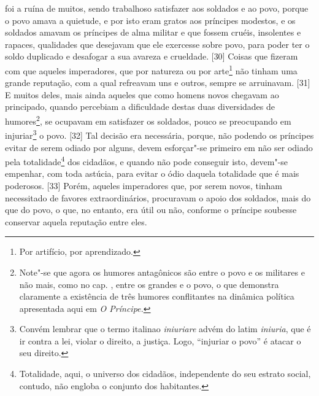 foi a ruína de muitos, sendo trabalhoso satisfazer aos soldados e ao
povo, porque o povo amava a quietude, e por isto eram gratos aos
príncipes modestos, e os soldados amavam os príncipes de alma militar e
que fossem cruéis, insolentes e rapaces, qualidades que desejavam que
ele exercesse sobre povo, para poder ter o soldo duplicado e desafogar a
sua avareza e crueldade. {[}30{]} Coisas que fizeram com que aqueles
imperadores, que por natureza ou por arte\footnote{Por artifício, por
  aprendizado.} não tinham uma grande reputação, com a qual refreavam
uns e outros, sempre se arruinavam. {[}31{]} E muitos deles, mais ainda
aqueles que como homens novos chegavam ao principado, quando percebiam a
dificuldade destas duas diversidades de humores\footnote{Note"-se que
  agora os humores antagônicos são entre o povo e os militares e não
  mais, como no cap. , entre os grandes e o povo, o que demonstra
  claramente a existência de três humores conflitantes na dinâmica
  política apresentada aqui em \emph{O Príncipe.}}, se ocupavam em
satisfazer os soldados, pouco se preocupando em injuriar\footnote{Convém
  lembrar que o termo italinao \emph{iniuriare} advém do latim
  \emph{iniuria}, que é ir contra a lei, violar o direito, a justiça.
  Logo, ``injuriar o povo'' é atacar o seu direito.} o povo. {[}32{]}
Tal decisão era necessária, porque, não podendo os príncipes evitar de
serem odiado por alguns, devem esforçar"-se primeiro em não ser odiado
pela totalidade\footnote{Totalidade, aqui, o universo dos cidadãos,
  independente do seu estrato social, contudo, não engloba o conjunto
  dos habitantes.} dos cidadãos, e quando não pode conseguir isto,
devem"-se empenhar, com toda astúcia, para evitar o ódio daquela
totalidade que é mais poderosos. {[}33{]} Porém, aqueles imperadores
que, por serem novos, tinham necessitado de favores extraordinários,
procuravam o apoio dos soldados, mais do que do povo, o que, no entanto,
era útil ou não, conforme o príncipe soubesse conservar aquela reputação
entre eles.

